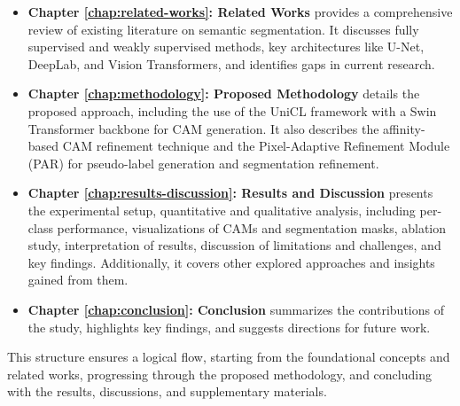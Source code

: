 \begin{itemize}
    \item \textbf{Chapter \ref{chap:related-works}: Related Works} provides a comprehensive review of existing literature on semantic segmentation. It discusses fully supervised and weakly supervised methods, key architectures like U-Net, DeepLab, and Vision Transformers, and identifies gaps in current research.

    \item \textbf{Chapter \ref{chap:methodology}: Proposed Methodology} details the proposed approach, including the use of the UniCL framework with a Swin Transformer backbone for CAM generation. It also describes the affinity-based CAM refinement technique and the Pixel-Adaptive Refinement Module (PAR) for pseudo-label generation and segmentation refinement.
    \item \textbf{Chapter \ref{chap:results-discussion}: Results and Discussion} presents the experimental setup, quantitative and qualitative analysis, including per-class performance, visualizations of CAMs and segmentation masks, ablation study, interpretation of results, discussion of limitations and challenges, and key findings. Additionally, it covers other explored approaches and insights gained from them.

    \item \textbf{Chapter \ref{chap:conclusion}: Conclusion} summarizes the contributions of the study, highlights key findings, and suggests directions for future work.
\end{itemize}

This structure ensures a logical flow, starting from the foundational concepts and related works, progressing through the proposed methodology, and concluding with the results, discussions, and supplementary materials.

